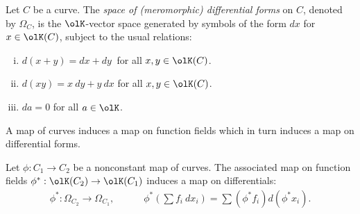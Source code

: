 \begin{defn}\label{defn:differential-forms}
	Let $C$ be a curve. The \emph{space of (meromorphic) differential forms} on $C$, denoted by $\Omega_C$, is the $\olK$-vector space generated by symbols of the form $dx$ for $x \in \olK(C)$, subject to the usual relations:
	\begin{enumerate}[(i)]
		\item $d(x+y) = dx + dy~$ \hspace{0.5em}for all $x,y \in \olK(C)$.
		\item $d(xy) = x~dy + y~dx$ \hspace{0.45em}for all $x,y\in \olK(C)$.
		\item $da = 0$ \hspace{5.55em}for all $a \in \olK$.
	\end{enumerate}
\end{defn}

A map of curves induces a map on function fields which in turn induces a map on differential forms.

\begin{rmk}\label{rmk:induced-map-on-diff-forms}
Let $\phi:C_1\to C_2$ be a nonconstant map of curves. The associated map on function fields $\phi^*:\olK(C_2)\to \olK(C_1)$ induces a map on differentials:
	\begin{align*}
	    \phi^*:\Omega_{C_2} \to \Omega_{C_1}, \hspace{3em} \phi^*\left(\sum f_i~dx_i\right) = \sum(\phi^*f_i)d(\phi^*x_i).
	\end{align*}
\end{rmk}

